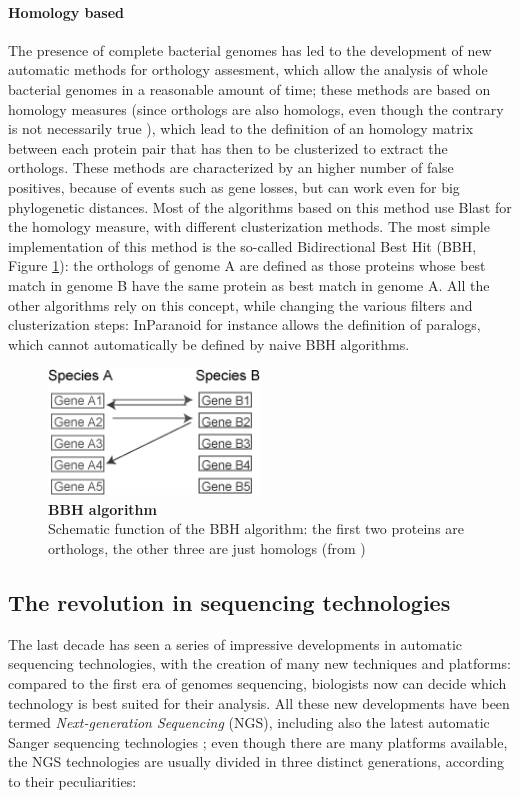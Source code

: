 \paragraph{Homology based}
The presence of complete bacterial genomes has led to the development of new automatic methods for orthology assesment, which allow the analysis of whole bacterial genomes in a reasonable amount of time; these methods are based on homology measures (since orthologs are also homologs, even though the contrary is not necessarily true \cite{altenhoff2009phylogenetic}), which lead to the definition of an homology matrix between each protein pair that has then to be clusterized to extract the orthologs. These methods are characterized by an higher number of false positives, because of events such as gene losses, but can work even for big phylogenetic distances. Most of the algorithms based on this method use Blast for the homology measure, with different clusterization methods. The most simple implementation of this method is the so-called Bidirectional Best Hit (BBH, Figure \ref{fig:bbh}): the orthologs of genome A are defined as those proteins whose best match in genome B have the same protein as best match in genome A. All the other algorithms rely on this concept, while changing the various filters and clusterization steps: InParanoid for instance allows the definition of paralogs, which cannot automatically be defined by naive BBH algorithms.

\begin{figure}[!tb]
	\center
    \includegraphics[width=0.5\textwidth]{figures/Introduction/thesis_6}
	\caption{\label{fig:bbh}\textbf{BBH algorithm}\\
			Schematic function of the BBH algorithm: the first two proteins are orthologs, the other three are just homologs (from \cite{bbh})}
\end{figure}

\subsection{The revolution in sequencing technologies}
\label{sec:revolution}
The last decade has seen a series of impressive developments in automatic sequencing technologies, with the creation of many new techniques and platforms: compared to the first era of genomes sequencing, biologists now can decide which technology is best suited for their analysis. All these new developments have been termed \textit{Next-generation Sequencing} (NGS), including also the latest automatic Sanger sequencing technologies \cite{glenn2011field}; even though there are many platforms available, the NGS technologies are usually divided in three distinct generations, according to their peculiarities:

